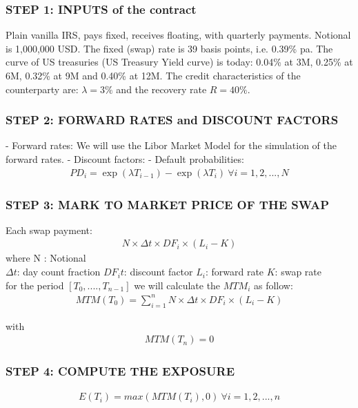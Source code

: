 \documentclass[11pt]{article}
\numberwithin{equation}{subsection}
\begin{document}
\subsubsection{STEP 1: INPUTS of the contract}
Plain vanilla IRS, pays fixed, receives floating, with quarterly payments. Notional is 1,000,000 USD. 
The fixed (swap) rate is 39 basis points, i.e. 0.39\% pa. The curve of US treasuries (US Treasury Yield curve) is today:
0.04\% at 3M, 0.25\% at 6M, 0.32\% at 9M and 0.40\% at 12M. The credit characteristics of the
counterparty are:
\(\lambda=3\%\) and the recovery rate \(R=40\%\). 
\subsubsection{STEP 2: FORWARD RATES and DISCOUNT FACTORS}

- Forward rates:  We will use the Libor Market Model for the simulation of the forward rates.
- Discount factors:
- Default probabilities:
\begin{eqnarray*}
	PD_{i}= \exp(\lambda T_{i-1})-\exp(\lambda T_{i}) \ \forall i =1,2,...,N
\end{eqnarray*}

\subsubsection{STEP 3: MARK TO MARKET PRICE OF THE SWAP}

Each swap payment:
\begin{eqnarray*}
	N \times \Delta t \times DF_i \times (L_i - K) 
\end{eqnarray*}
where 
N : Notional\\
\(\Delta t\): day count fraction
\(DF_i t\): discount factor
\(L_i\): forward rate
\(K\): swap rate \\

for the period \([T_0,...., T_{n-1}]\) we will calculate the \(MTM_i\) as follow:
\begin{eqnarray*}
	MTM(T_0) = \sum_{i=1}^{n} N \times \Delta t \times DF_i \times (L_i - K) 
\end{eqnarray*}

with 
\begin{eqnarray*}
	MTM(T_n) = 0
\end{eqnarray*}

\subsubsection{STEP 4: COMPUTE THE EXPOSURE}
\begin{eqnarray*}
	E(T_i) = max(MTM(T_i), 0) \ \forall i = 1,2,...,n
\end{eqnarray*}
\end{document}
